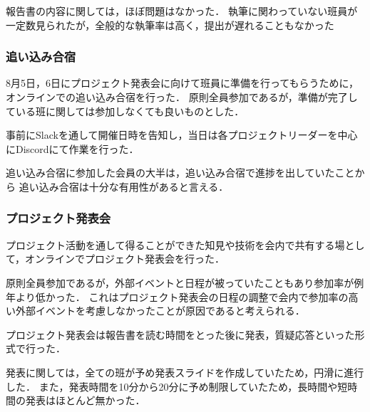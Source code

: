 報告書の内容に関しては，ほぼ問題はなかった．
執筆に関わっていない班員が一定数見られたが，全般的な執筆率は高く，提出が遅れることもなかった

\subsubsection*{追い込み合宿}
8月5日，6日にプロジェクト発表会に向けて班員に準備を行ってもらうために，オンラインでの追い込み合宿を行った．
原則全員参加であるが，準備が完了している班に関しては参加しなくても良いものとした．

事前にSlackを通して開催日時を告知し，当日は各プロジェクトリーダーを中心にDiscordにて作業を行った．

追い込み合宿に参加した会員の大半は，追い込み合宿で進捗を出していたことから
追い込み合宿は十分な有用性があると言える．

\subsubsection*{プロジェクト発表会}
プロジェクト活動を通して得ることができた知見や技術を会内で共有する場として，オンラインでプロジェクト発表会を行った．

原則全員参加であるが，外部イベントと日程が被っていたこともあり参加率が例年より低かった．
これはプロジェクト発表会の日程の調整で会内で参加率の高い外部イベントを考慮しなかったことが原因であると考えられる．

プロジェクト発表会は報告書を読む時間をとった後に発表，質疑応答といった形式で行った．

発表に関しては，全ての班が予め発表スライドを作成していたため，円滑に進行した．
また，発表時間を10分から20分に予め制限していたため，長時間や短時間の発表はほとんど無かった．
